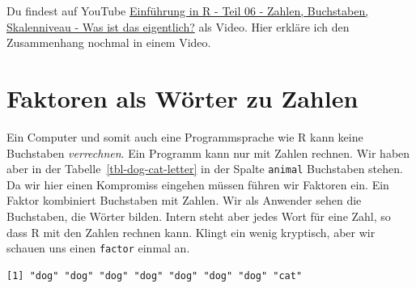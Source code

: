 \documentclass[
  letterpaper,
]{scrbook}
\newenvironment{Shaded}{\begin{snugshade}}{\end{snugshade}}
\newcommand{\DecValTok}[1]{\textcolor[rgb]{0.68,0.00,0.00}{#1}}
\newcommand{\NormalTok}[1]{\textcolor[rgb]{0.00,0.23,0.31}{#1}}
\newcommand{\SpecialCharTok}[1]{\textcolor[rgb]{0.37,0.37,0.37}{#1}}
\begin{document}
\begin{tcolorbox}[enhanced jigsaw, coltitle=black, titlerule=0mm, bottomrule=.15mm, opacityback=0, opacitybacktitle=0.6, leftrule=.75mm, title=\textcolor{quarto-callout-tip-color}{\faLightbulb}\hspace{0.5em}{Zahlen, Buchstaben, Skalenniveau - Was ist das eigentlich?}, toprule=.15mm, bottomtitle=1mm, toptitle=1mm, left=2mm, breakable, arc=.35mm, colback=white, rightrule=.15mm, colbacktitle=quarto-callout-tip-color!10!white, colframe=quarto-callout-tip-color-frame]
Du findest auf YouTube \href{https://youtu.be/OnRaSmybhOQ}{Einführung in
R - Teil 06 - Zahlen, Buchstaben, Skalenniveau - Was ist das
eigentlich?} als Video. Hier erkläre ich den Zusammenhang nochmal in
einem Video.
\end{tcolorbox}

\hypertarget{faktoren-als-wuxf6rter-zu-zahlen}{%
\section{Faktoren als Wörter zu
Zahlen}\label{faktoren-als-wuxf6rter-zu-zahlen}}

{}

Ein Computer und somit auch eine Programmsprache wie R kann keine
Buchstaben \emph{verrechnen}. Ein Programm kann nur mit Zahlen rechnen.
Wir haben aber in der Tabelle~\ref{tbl-dog-cat-letter} in der Spalte
\texttt{animal} Buchstaben stehen. Da wir hier einen Kompromiss eingehen
müssen führen wir Faktoren ein. Ein Faktor kombiniert Buchstaben mit
Zahlen. Wir als Anwender sehen die Buchstaben, die Wörter bilden. Intern
steht aber jedes Wort für eine Zahl, so dass R mit den Zahlen rechnen
kann. Klingt ein wenig kryptisch, aber wir schauen uns einen
\texttt{factor} einmal an.

\begin{Shaded}
\end{Shaded}

\begin{verbatim}
[1] "dog" "dog" "dog" "dog" "dog" "dog" "dog" "cat"
\end{verbatim}
\end{document}

